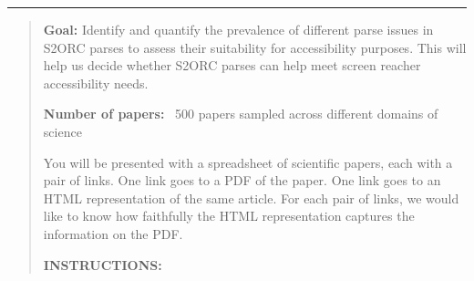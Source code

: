 \begin{center}
\noindent \rule{0.9\linewidth}{0.4pt}
\end{center}
\begin{quote}
\textbf{Goal:} Identify and quantify the prevalence of different parse issues in S2ORC parses to assess their suitability for accessibility purposes. This will help us decide whether S2ORC parses can help meet screen reacher accessibility needs.

\vspace{4pt}\noindent\textbf{Number of papers:} ~500 papers sampled across different domains of science

\vspace{4pt}\noindent You will be presented with a spreadsheet of scientific papers, each with a pair of links. One link goes to a PDF of the paper. One link goes to an HTML representation of the same article. For each pair of links, we would like to know how faithfully the HTML representation captures the information on the PDF.

\vspace{4pt}\noindent\textbf{INSTRUCTIONS:}


\end{quote}
